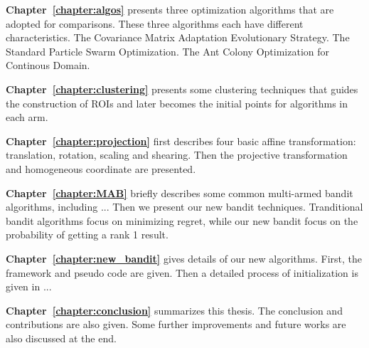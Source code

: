 \textbf{Chapter~\ref{chapter:algos}} presents three optimization algorithms that are adopted for comparisons. 
These three algorithms each have different characteristics. 
The Covariance Matrix Adaptation Evolutionary Strategy.
The Standard Particle Swarm Optimization.
The Ant Colony Optimization for Continous Domain.


\textbf{Chapter~\ref{chapter:clustering}} presents some clustering techniques that guides the construction of ROIs and later becomes the initial points for algorithms in each arm.


\textbf{Chapter~\ref{chapter:projection}} first describes four basic affine transformation: translation, rotation, scaling and shearing.
Then the projective transformation and homogeneous coordinate are presented.


\textbf{Chapter~\ref{chapter:MAB}} briefly describes some common multi-armed bandit algorithms, including ...
Then we present our new bandit techniques.
Tranditional bandit algorithms focus on minimizing regret, while our new bandit focus on the probability of getting a rank 1 result.


\textbf{Chapter~\ref{chapter:new_bandit}} gives details of our new algorithms.
First, the framework and pseudo code are given.
Then a detailed process of initialization is given in ...

\textbf{Chapter~\ref{chapter:conclusion}} summarizes this thesis. 
The conclusion and contributions are also given.
Some further improvements and future works are also discussed at the end.


